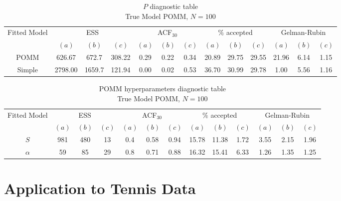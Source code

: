 \documentclass[11pt]{amsart}
\begin{document}
\begin{table}[htbp]
\centering
\caption*{
{\large $P$ diagnostic table} \\ 
{\small True Model POMM, $N=100$}
} 
\begin{tabular}{ccccccccccccc}
\toprule
\multirow{2}{*}{Fitted Model} & \multicolumn{3}{c}{ESS} & \multicolumn{3}{c}{
ACF$_{30}$} & \multicolumn{3}{c}{$\%$ accepted} & \multicolumn{3}{c}{Gelman-Rubin}\\
\cmidrule(lr){2-4} \cmidrule(lr){5-7} \cmidrule(lr){8-10} \cmidrule(lr){11-13} 
& $(a)$ & $(b)$ & $(c)$ & $(a)$ & $(b)$ & $(c)$ & $(a)$ & $(b)$ & $(c)$ & $(a)$ & $(b)$ & $(c)$ \\
\midrule
POMM &626.67 & 672.7 & 308.22 & 0.29 & 0.22 & 0.34 & 20.89 & 29.75 & 29.55 & 21.96 & 6.14 & 1.15   \\
Simple &2798.00 & 1659.7 & 121.94 & 0.00 & 0.02 & 0.53 & 36.70 & 30.99 & 29.78 & 1.00 & 5.56 & 1.16    \\
\bottomrule
\end{tabular}
\label{table:simulations_from_simple}
\end{table}


\begin{table}[htbp]
\centering
\caption*{
{\large POMM hyperparameters diagnostic table} \\ 
{\small True Model POMM, $N=100$}
} 
\begin{tabular}{ccccccccccccc}
\toprule
\multirow{2}{*}{Fitted Model} & \multicolumn{3}{c}{ESS} & \multicolumn{3}{c}{
ACF$_{30}$} & \multicolumn{3}{c}{$\%$ accepted} & \multicolumn{3}{c}{Gelman-Rubin}\\
\cmidrule(lr){2-4} \cmidrule(lr){5-7} \cmidrule(lr){8-10} \cmidrule(lr){11-13} 
& $(a)$ & $(b)$ & $(c)$ & $(a)$ & $(b)$ & $(c)$ & $(a)$ & $(b)$ & $(c)$ & $(a)$ & $(b)$ & $(c)$ \\
\midrule
$S$ &981 & 480 & 13 & 0.4 & 0.58 & 0.94 & 15.78 & 11.38 & 1.72 & 3.55 & 2.15 & 1.96  \\
$\alpha$ &59 & 85 & 29 & 0.8 & 0.71 & 0.88 & 16.32 & 15.41 & 6.33 & 1.26 & 1.35 & 1.25    \\
\bottomrule
\end{tabular}
\label{table:simulations_from_simple}
\end{table}






\clearpage

\section{Application to Tennis Data}
\end{document}
